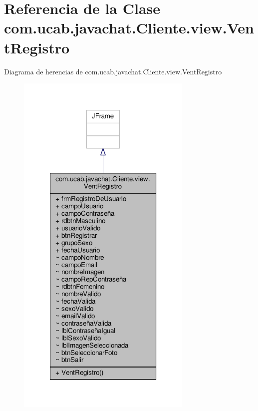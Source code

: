 \hypertarget{classcom_1_1ucab_1_1javachat_1_1_cliente_1_1view_1_1_vent_registro}{\section{Referencia de la Clase com.\-ucab.\-javachat.\-Cliente.\-view.\-Vent\-Registro}
\label{classcom_1_1ucab_1_1javachat_1_1_cliente_1_1view_1_1_vent_registro}
}


Diagrama de herencias de com.\-ucab.\-javachat.\-Cliente.\-view.\-Vent\-Registro
\nopagebreak
\begin{figure}[H]
\begin{center}
\leavevmode
\includegraphics[width=238pt]{d9/d76/classcom_1_1ucab_1_1javachat_1_1_cliente_1_1view_1_1_vent_registro__inherit__graph}
\end{center}
\end{figure}


